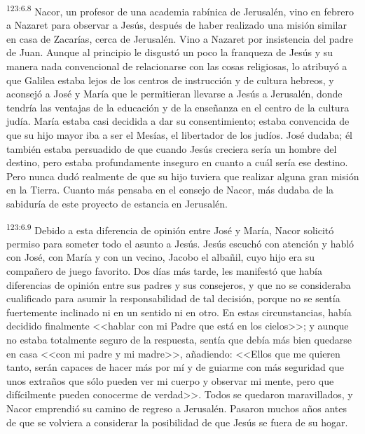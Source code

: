 \par 
\textsuperscript{123:6.8} Nacor, un profesor de una academia rabínica de Jerusalén, vino en febrero a Nazaret para observar a Jesús, después de haber realizado una misión similar en casa de Zacarías, cerca de Jerusalén. Vino a Nazaret por insistencia del padre de Juan. Aunque al principio le disgustó un poco la franqueza de Jesús y su manera nada convencional de relacionarse con las cosas religiosas, lo atribuyó a que Galilea estaba lejos de los centros de instrucción y de cultura hebreos, y aconsejó a José y María que le permitieran llevarse a Jesús a Jerusalén, donde tendría las ventajas de la educación y de la enseñanza en el centro de la cultura judía. María estaba casi decidida a dar su consentimiento; estaba convencida de que su hijo mayor iba a ser el Mesías, el libertador de los judíos. José dudaba; él también estaba persuadido de que cuando Jesús creciera sería un hombre del destino, pero estaba profundamente inseguro en cuanto a cuál sería ese destino. Pero nunca dudó realmente de que su hijo tuviera que realizar alguna gran misión en la Tierra. Cuanto más pensaba en el consejo de Nacor, más dudaba de la sabiduría de este proyecto de estancia en Jerusalén.

\par 
\textsuperscript{123:6.9} Debido a esta diferencia de opinión entre José y María, Nacor solicitó permiso para someter todo el asunto a Jesús. Jesús escuchó con atención y habló con José, con María y con un vecino, Jacobo el albañil, cuyo hijo era su compañero de juego favorito. Dos días más tarde, les manifestó que había diferencias de opinión entre sus padres y sus consejeros, y que no se consideraba cualificado para asumir la responsabilidad de tal decisión, porque no se sentía fuertemente inclinado ni en un sentido ni en otro. En estas circunstancias, había decidido finalmente <<hablar con mi Padre que está en los cielos>>; y aunque no estaba totalmente seguro de la respuesta, sentía que debía más bien quedarse en casa <<con mi padre y mi madre>>, añadiendo: <<Ellos que me quieren tanto, serán capaces de hacer más por mí y de guiarme con más seguridad que unos extraños que sólo pueden ver mi cuerpo y observar mi mente, pero que difícilmente pueden conocerme de verdad>>. Todos se quedaron maravillados, y Nacor emprendió su camino de regreso a Jerusalén. Pasaron muchos años antes de que se volviera a considerar la posibilidad de que Jesús se fuera de su hogar.